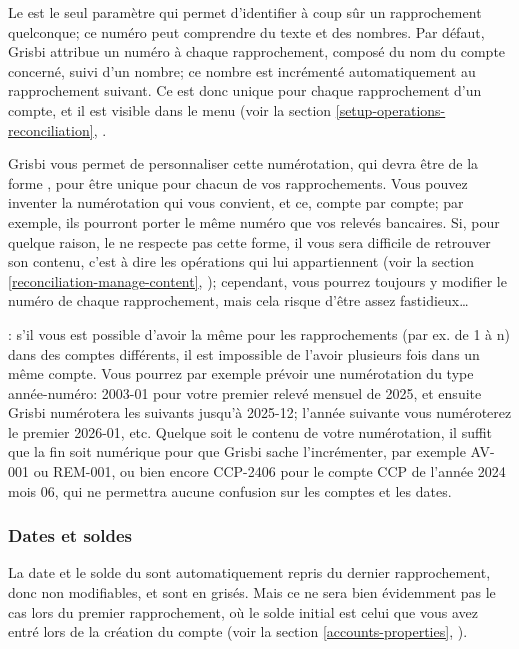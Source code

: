 Le  est le seul paramètre qui permet d'identifier à coup sûr un rapprochement quelconque; ce numéro peut comprendre du texte et des nombres. Par défaut, Grisbi attribue un numéro à chaque rapprochement, composé du nom du compte concerné, suivi d'un nombre; ce nombre est incrémenté automatiquement au rapprochement suivant. Ce  est donc unique pour chaque rapprochement d'un compte, et il est visible dans le menu  (voir la section \vref{setup-operations-reconciliation}, .

Grisbi vous permet de personnaliser cette numérotation, qui devra être de la forme , pour être unique pour chacun de vos rapprochements. Vous pouvez inventer la numérotation qui vous convient, et ce, compte par compte; par exemple, ils pourront porter le même numéro que vos relevés bancaires. Si, pour quelque raison, le  ne respecte pas cette forme, il vous sera difficile de retrouver son contenu, c'est à dire les opérations qui lui appartiennent (voir la section \vref{reconciliation-manage-content}, ); cependant, vous pourrez toujours y modifier le numéro de chaque rapprochement, mais cela risque d'être assez fastidieux\ldots

\Note{}: s'il vous est possible d'avoir la même  pour les rapprochements (par ex. de 1 à n) dans des comptes différents, il est impossible de l'avoir plusieurs fois dans un même compte. Vous pourrez par exemple prévoir une numérotation du type année-numéro: 2003-01 pour votre premier relevé mensuel de 2025, et ensuite Grisbi numérotera les suivants jusqu'à 2025-12; l'année suivante vous numéroterez le premier 2026-01, etc. Quelque soit le contenu de votre numérotation, il suffit que la fin soit numérique pour que Grisbi sache l'incrémenter, par exemple AV-001 ou REM-001, ou bien encore CCP-2406 pour le compte CCP de l'année 2024 mois 06, qui ne permettra aucune confusion sur les comptes et les dates.


\subsubsection{Dates et soldes\label{reconciliation-account-description-DateBalance}}

La date et le solde du  sont automatiquement repris du dernier rapprochement, donc non modifiables, et sont en grisés. Mais ce ne sera bien évidemment pas le cas lors du premier rapprochement, où le solde initial est celui que vous avez entré lors de la création du compte (voir la section \vref{accounts-properties}, ).

